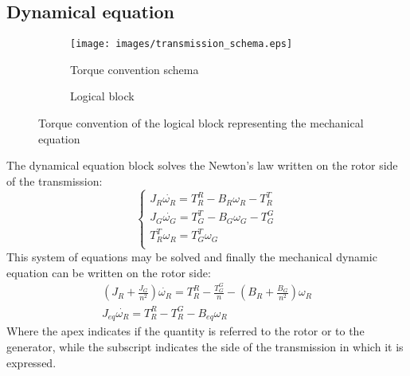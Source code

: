 \subsection{Dynamical equation}
\begin{figure}
  \centering
  \begin{subfigure}{0.6\columnwidth}
    \centering
    \texttt{[image: images/transmission\_schema.eps]}
    \caption{Torque convention schema}
    \label{fig:transmission_convention}
  \end{subfigure}
  
  \begin{subfigure}{0.5\columnwidth}
    \centering
      
      \caption{Logical block}
    \label{fig:d_mech_equation_block}
  \end{subfigure}
  \caption{Torque convention of the logical block representing the mechanical equation}
\end{figure}
The dynamical equation block solves the Newton's law written on the rotor side of the transmission:
\begin{equation}
    \begin{cases}
      J_R \dot{\omega_R} = T_R^R - B_R\omega_R - T_R^T\\
      J_G \dot{\omega_G} = T_G^T - B_G\omega_G - T_G^G\\
      T_R^T\omega_R = T_G^T\omega_G\\
    \end{cases}
\end{equation}
This system of equations may be solved and finally the mechanical dynamic equation can be written on the rotor side:
\begin{gather}
    \left(J_R + \frac{J_G}{n^2}\right) \dot{\omega_R} = T_R^R - \frac{T_G^G}{n} - \left(B_R + \frac{B_G}{n^2}\right)\omega_R \\
    J_{eq} \dot{\omega_R} = T_R^R - T_R^G - B_{eq}\omega_R
    \label{eq:mech_eq}
\end{gather}
Where the apex indicates if the quantity is referred to the rotor or to the generator, while the subscript indicates the side of the transmission in which it is expressed.

